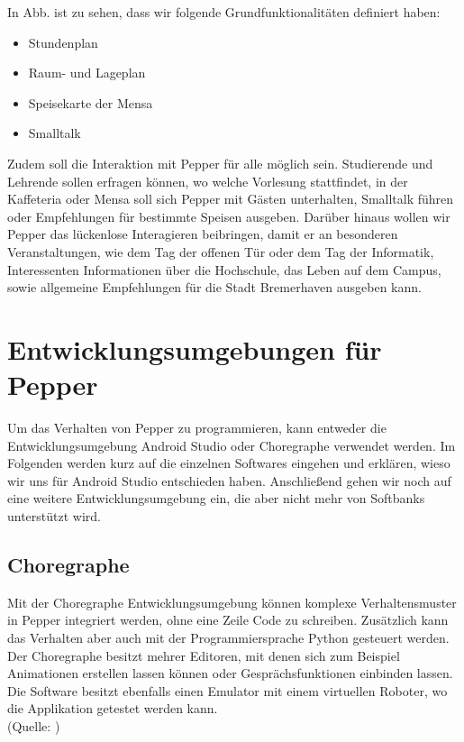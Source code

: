 

In Abb. %
ist zu sehen, dass wir folgende Grundfunktionalitäten definiert haben:

\begin{itemize}
    \item Stundenplan
    \item Raum- und Lageplan
    \item Speisekarte der Mensa
    \item Smalltalk
\end{itemize}

Zudem soll die Interaktion mit Pepper für alle möglich sein. Studierende und Lehrende sollen erfragen können,
wo welche Vorlesung stattfindet, in der Kaffeteria oder Mensa soll sich Pepper mit Gästen unterhalten, Smalltalk führen oder
Empfehlungen für bestimmte Speisen ausgeben. Darüber hinaus wollen wir Pepper das lückenlose Interagieren beibringen, damit er an
besonderen Veranstaltungen, wie dem Tag der offenen Tür oder dem Tag der Informatik, Interessenten Informationen über die Hochschule,
das Leben auf dem Campus, sowie allgemeine Empfehlungen für die Stadt Bremerhaven ausgeben kann.\\

\section{Entwicklungsumgebungen für Pepper}

Um das Verhalten von Pepper zu programmieren, kann entweder die Entwicklungsumgebung Android Studio oder Choregraphe verwendet werden. 
Im Folgenden werden kurz auf die einzelnen Softwares eingehen und erklären, wieso wir uns für Android Studio entschieden haben. 
Anschließend gehen wir noch auf eine weitere Entwicklungsumgebung ein, die aber nicht mehr von Softbanks unterstützt wird.\\

\subsection{Choregraphe}

Mit der Choregraphe Entwicklungsumgebung können komplexe Verhaltensmuster in Pepper integriert werden, ohne eine Zeile Code zu schreiben. 
Zusätzlich kann das Verhalten aber auch mit der Programmiersprache Python gesteuert werden. Der Choregraphe besitzt mehrer Editoren, 
mit denen sich zum Beispiel Animationen erstellen lassen können oder Gesprächsfunktionen einbinden lassen. Die Software besitzt ebenfalls 
einen Emulator mit einem virtuellen Roboter, wo die Applikation getestet werden kann.\\
(Quelle: \cite{Choregraphe})\\

